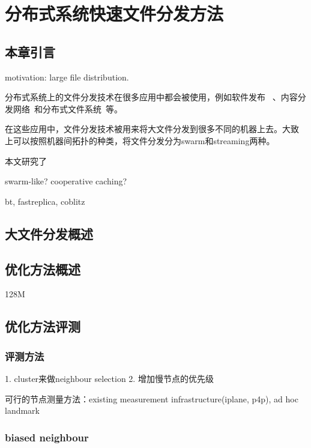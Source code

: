 \chapter{分布式系统快速文件分发方法}
\label{chap:bt}

\section{本章引言}

motivation: large file distribution.

分布式系统上的文件分发技术在很多应用中都会被使用，例如软件发布~
\cite{xxx}、内容分发网络~\cite{xxx}和分布式文件系统~\cite{xxx}等。

在这些应用中，文件分发技术被用来将大文件分发到很多不同的机器上去。大致
上可以按照机器间拓扑的种类，将文件分发分为swarm和streaming两种。

本文研究了

swarm-like? cooperative caching? 

bt, fastreplica, coblitz


\section{大文件分发概述}



\section{优化方法概述}

128M

\section{优化方法评测}

\subsection{评测方法}
1. cluster来做neighbour selection
2. 增加慢节点的优先级

可行的节点测量方法：existing measurement infrastructure(iplane, p4p), ad hoc
landmark

\subsection{biased neighbour}


